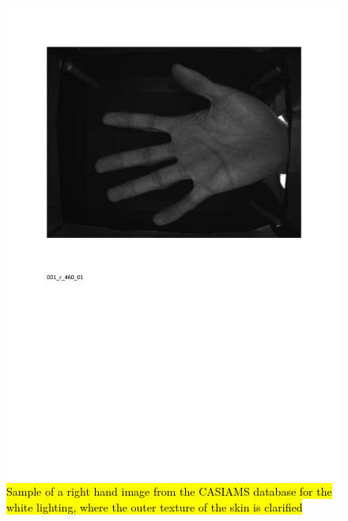 \documentclass[review]{elsarticle}
\begin{document}
	\begin{figure}[!h]
		\centering
		\includegraphics[page=6,scale=.57,trim=1cm 14.7cm 1cm 1.7cm,clip]{CASIA_multi_spectral_samples.pdf}
		\caption{\hl{Sample of a right hand image from the CASIAMS database for the white lighting, where the outer texture of the skin is clarified}}
		\label{fig:CASIA_white_lighting}
	\end{figure}
\end{document}
